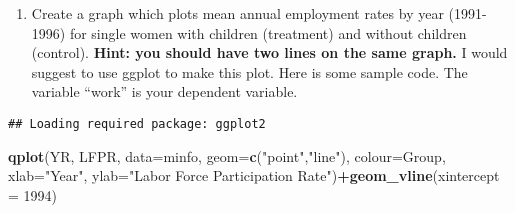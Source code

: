 \documentclass[
]{article}
\newenvironment{Shaded}{\begin{snugshade}}{\end{snugshade}}
\newcommand{\AttributeTok}[1]{\textcolor[rgb]{0.13,0.29,0.53}{#1}}
\newcommand{\CommentTok}[1]{\textcolor[rgb]{0.56,0.35,0.01}{\textit{#1}}}
\newcommand{\DecValTok}[1]{\textcolor[rgb]{0.00,0.00,0.81}{#1}}
\newcommand{\FunctionTok}[1]{\textcolor[rgb]{0.13,0.29,0.53}{\textbf{#1}}}
\newcommand{\NormalTok}[1]{#1}
\newcommand{\OtherTok}[1]{\textcolor[rgb]{0.56,0.35,0.01}{#1}}
\newcommand{\SpecialCharTok}[1]{\textcolor[rgb]{0.81,0.36,0.00}{\textbf{#1}}}
\newcommand{\StringTok}[1]{\textcolor[rgb]{0.31,0.60,0.02}{#1}}
\providecommand{\tightlist}{%
  \setlength{\itemsep}{0pt}\setlength{\parskip}{0pt}}
\begin{document}
\begin{enumerate}
\def\labelenumi{\arabic{enumi}.}
\setcounter{enumi}{3}
\tightlist
\item
  Create a graph which plots mean annual employment rates by year
  (1991-1996) for single women with children (treatment) and without
  children (control). \textbf{Hint: you should have two lines on the
  same graph.} I would suggest to use ggplot to make this plot. Here is
  some sample code. The variable ``work'' is your dependent variable.
\end{enumerate}

\begin{Shaded}
\end{Shaded}

\begin{verbatim}
## Loading required package: ggplot2
\end{verbatim}

\begin{Shaded}
\begin{Highlighting}[]
\FunctionTok{qplot}\NormalTok{(YR, LFPR, }\AttributeTok{data=}\NormalTok{minfo, }\AttributeTok{geom=}\FunctionTok{c}\NormalTok{(}\StringTok{"point"}\NormalTok{,}\StringTok{"line"}\NormalTok{), }\AttributeTok{colour=}\NormalTok{Group,}
\AttributeTok{xlab=}\StringTok{"Year"}\NormalTok{, }\AttributeTok{ylab=}\StringTok{"Labor Force Participation Rate"}\NormalTok{)}\SpecialCharTok{+}\FunctionTok{geom\_vline}\NormalTok{(}\AttributeTok{xintercept =} \DecValTok{1994}\NormalTok{)}
\end{Highlighting}
\end{Shaded}
\end{document}
